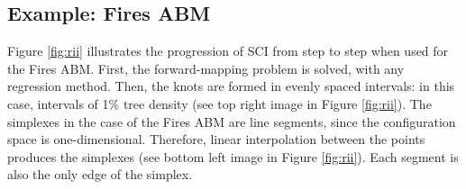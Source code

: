 \subsection{Example: Fires ABM}

Figure \ref{fig:rii} illustrates the progression of SCI from step to step when used for the Fires ABM.
First, the forward-mapping problem is solved, with any regression method.
Then, the knots are formed in evenly spaced intervals: in this case, intervals of 1\% tree density (see top right image in Figure \ref{fig:rii}).
The simplexes in the case of the Fires ABM are line segments, since the configuration space is one-dimensional.
Therefore, linear interpolation between the points produces the simplexes (see bottom left image in Figure \ref{fig:rii}).
Each segment is also the only edge of the simplex.

